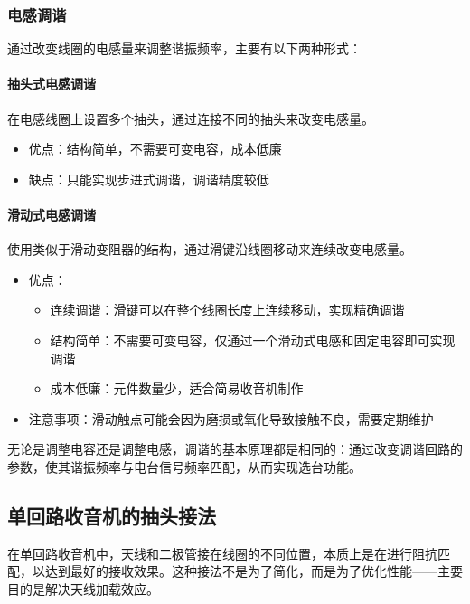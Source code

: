 \documentclass[12pt,UTF8]{ctexbook}
\begin{document}
\subsubsection{电感调谐}

通过改变线圈的电感量来调整谐振频率，主要有以下两种形式：

\paragraph{抽头式电感调谐}

在电感线圈上设置多个抽头，通过连接不同的抽头来改变电感量。

\begin{itemize}[leftmargin=3.5em]
    \item 优点：结构简单，不需要可变电容，成本低廉
    \item 缺点：只能实现步进式调谐，调谐精度较低
\end{itemize}

\paragraph{滑动式电感调谐}

使用类似于滑动变阻器的结构，通过滑键沿线圈移动来连续改变电感量。

\begin{itemize}[leftmargin=3.5em]
    \item 优点：
    \begin{itemize}
        \item 连续调谐：滑键可以在整个线圈长度上连续移动，实现精确调谐
        \item 结构简单：不需要可变电容，仅通过一个滑动式电感和固定电容即可实现调谐
        \item 成本低廉：元件数量少，适合简易收音机制作
    \end{itemize}
    \item 注意事项：滑动触点可能会因为磨损或氧化导致接触不良，需要定期维护
\end{itemize}

无论是调整电容还是调整电感，调谐的基本原理都是相同的：通过改变调谐回路的参数，使其谐振频率与电台信号频率匹配，从而实现选台功能。

\subsection{单回路收音机的抽头接法}

在单回路收音机中，天线和二极管接在线圈的不同位置，本质上是在进行阻抗匹配，以达到最好的接收效果。这种接法不是为了简化，而是为了优化性能——主要目的是解决天线加载效应。
\end{document}
